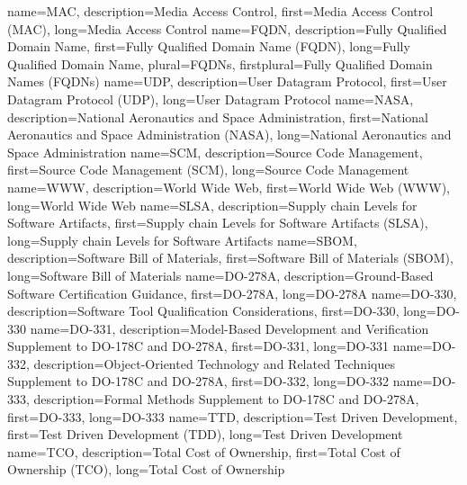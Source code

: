 {%
    name={MAC},
    description={Media Access Control},
    first={Media Access Control (MAC)},
    long={Media Access Control}
}
{%
    name={FQDN},
    description={Fully Qualified Domain Name},
    first={Fully Qualified Domain Name (FQDN)},
    long={Fully Qualified Domain Name},
    plural={FQDNs},
    firstplural={Fully Qualified Domain Names (FQDNs)}
}
{%
    name={UDP},
    description={User Datagram Protocol},
    first={User Datagram Protocol (UDP)},
    long={User Datagram Protocol}
}
{%
    name={NASA},
    description={National Aeronautics and Space Administration},
    first={National Aeronautics and Space Administration (NASA)},
    long={National Aeronautics and Space Administration}
}
{%
    name={SCM},
    description={Source Code Management},
    first={Source Code Management (SCM)},
    long={Source Code Management}
}
{%
    name={WWW},
    description={World Wide Web},
    first={World Wide Web (WWW)},
    long={World Wide Web}
}
{%
    name={SLSA},
    description={Supply chain Levels for Software Artifacts},
    first={Supply chain Levels for Software Artifacts (SLSA)},
    long={Supply chain Levels for Software Artifacts}
}
{%
    name={SBOM},
    description={Software Bill of Materials},
    first={Software Bill of Materials (SBOM)},
    long={Software Bill of Materials}
}
{%
    name={DO-278A},
    description={Ground-Based Software Certification Guidance},
    first={DO-278A},
    long={DO-278A}
}
{%
    name={DO-330},
    description={Software Tool Qualification Considerations},
    first={DO-330},
    long={DO-330}
}
{%
    name={DO-331},
    description={Model-Based Development and Verification Supplement to DO-178C and DO-278A},
    first={DO-331},
    long={DO-331}
}
{%
    name={DO-332},
    description={Object-Oriented Technology and Related Techniques Supplement to DO-178C and DO-278A},
    first={DO-332},
    long={DO-332}
}
{%
    name={DO-333},
    description={Formal Methods Supplement to DO-178C and DO-278A},
    first={DO-333},
    long={DO-333}
}
{%
    name={TTD},
    description={Test Driven Development},
    first={Test Driven Development (TDD)},
    long={Test Driven Development}
}
{%
    name={TCO},
    description={Total Cost of Ownership},
    first={Total Cost of Ownership (TCO)},
    long={Total Cost of Ownership}
}
